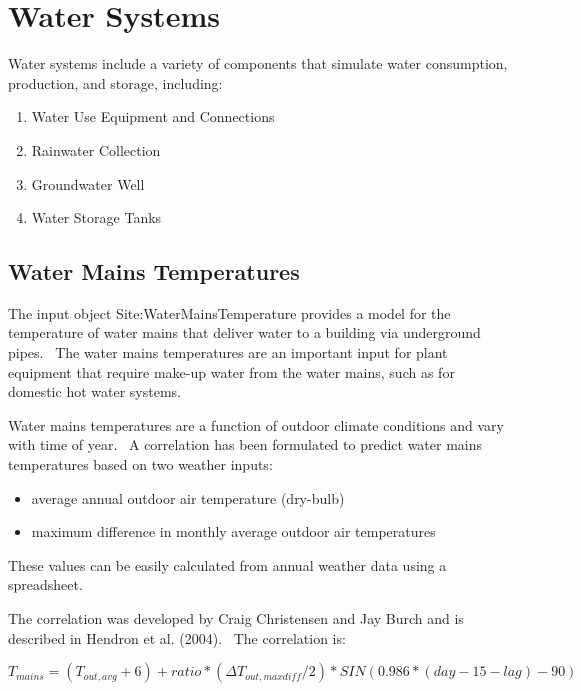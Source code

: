 \section{Water Systems }\label{water-systems}

Water systems include a variety of components that simulate water consumption, production, and storage, including:

\begin{enumerate}
\item Water Use Equipment and Connections
\item Rainwater Collection
\item Groundwater Well
\item Water Storage Tanks
\end{enumerate}

\subsection{Water Mains Temperatures}\label{water-mains-temperatures}

The input object Site:WaterMainsTemperature provides a model for the temperature of water mains that deliver water to a building via underground pipes.~ The water mains temperatures are an important input for plant equipment that require make-up water from the water mains, such as for domestic hot water systems.

Water mains temperatures are a function of outdoor climate conditions and vary with time of year.~ A correlation has been formulated to predict water mains temperatures based on two weather inputs:

\begin{itemize}
\item average annual outdoor air temperature (dry-bulb)
\item maximum difference in monthly average outdoor air temperatures
\end{itemize}

These values can be easily calculated from annual weather data using a spreadsheet.

The correlation was developed by Craig Christensen and Jay Burch and is described in Hendron et al. (2004).~ The correlation is:

\begin{equation}
T_{mains} = (T_{out,avg} + 6) + ratio * (\Delta T_{out,maxdiff} / 2) * SIN(0.986 * (day - 15 - lag) - 90)
\end{equation}

